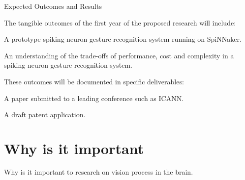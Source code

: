 Expected Outcomes and Results

The tangible outcomes of the first year of the proposed research will include:

A prototype spiking neuron gesture recognition system running on SpiNNaker.

An understanding of the trade-offs of performance, cost and complexity in a spiking neuron gesture recognition system.

These outcomes will be documented in specific deliverables:

A paper submitted to a leading conference such as ICANN.

A draft patent application.

\section{Why is it important}
\label{sec:imp}
Why is it important to research on vision process in the brain.